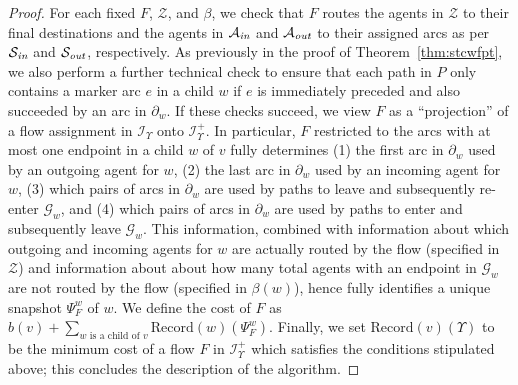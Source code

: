 \documentclass[letterpaper]{article} %
\newcommand{\forgottenG}{\mathcal{G}}
\newcommand{\Rec}{\text{Record}}
\newcommand{\Sout}{\mathcal{S}_\emph{out}}
\newcommand{\Sin}{\mathcal{S}_\emph{in}}
\newcommand{\Aout}{\mathcal{A}_\emph{out}}
\newcommand{\Ain}{\mathcal{A}_\emph{in}}
\newcommand{\Imp}{\mathcal{Z}}
\begin{document}
\begin{proof}
For each fixed $F$, $\Imp$, and $\beta$, we check that $F$ routes the agents in $\Imp$ to their final destinations and the agents in $\Ain$ and $\Aout$ to their assigned arcs as per $\Sin$ and $\Sout$, respectively. As previously in the proof of Theorem~\ref{thm:stcwfpt}, we also perform a further technical check to ensure that each path in $P$ only contains a marker arc $e$ in a child $w$ if $e$ is immediately preceded and also succeeded by an arc in $\partial_w$. If these checks succeed, we view $F$ as a ``projection'' of a flow assignment in $\mathcal{I}_\Upsilon$ onto $\mathcal{I}^+_\Upsilon$. In particular, $F$ restricted to the arcs with at most one endpoint in a child $w$ of $v$ fully determines (1) the first arc in $\partial_w$ used by an outgoing agent for $w$, (2) the last arc in $\partial_w$ used by an incoming agent for $w$, (3) which pairs of arcs in $\partial_w$ are used by paths to leave and subsequently re-enter $\forgottenG_w$, and (4) which pairs of arcs in $\partial_w$ are used by paths to enter and subsequently leave $\forgottenG_w$. This information, combined with information about which outgoing and incoming agents for $w$ are actually routed by the flow (specified in $\Imp$) and information about about how many total agents with an endpoint in $\forgottenG_w$ are not routed by the flow (specified in $\beta(w)$), hence fully identifies a unique snapshot $\Psi^w_F$ of $w$. We define the cost of $F$ as $b(v)+\sum_{w\text{ is a child of }v}\Rec(w)(\Psi^w_F)$. Finally, we set $\Rec(v)(\Upsilon)$ to be the minimum cost of a flow $F$ in $\mathcal{I}^+_\Upsilon$ which satisfies the conditions stipulated above; this concludes the description of the algorithm.


\end{proof}
\end{document}
